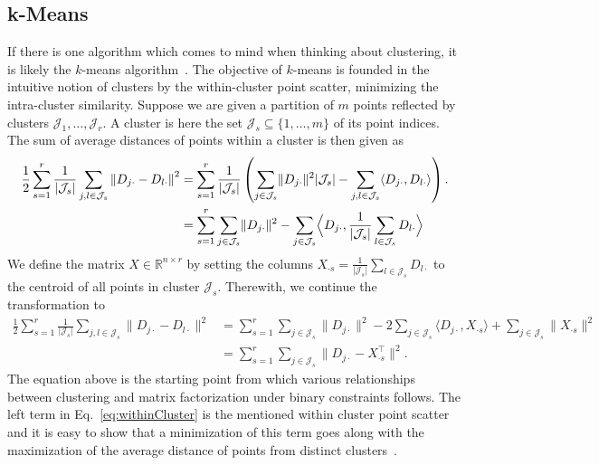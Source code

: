 \subsection{k-Means}\label{sec:ZS:kmeans}
If there is one algorithm which comes to mind when thinking about clustering, it is likely the $k$-means algorithm~\citep{lloyd1982least}. The objective of $k$-means is founded in the intuitive notion of clusters by the within-cluster point scatter, minimizing the intra-cluster similarity.
Suppose we are given a partition of $m$ points reflected by clusters $\mathcal{J}_1,\ldots, \mathcal{J}_r$. A cluster is here the set $\mathcal{J}_s\subseteq \{1,\ldots, m\}$ of its point indices. The sum of average distances of points within a cluster is then given as
\begin{align*}
\frac{1}{2}\sum_{s=1}^r\frac{1}{\lvert \mathcal{J}_s\rvert }\sum_{j,l\in \mathcal{J}_s} \left\lVert D_{j\cdot}-D_{l\cdot}\right\rVert ^2 
&= \sum_{s=1}^r \frac{1}{\lvert \mathcal{J}_s\rvert }\left(\sum_{j\in \mathcal{J}_s} \lVert D_{j\cdot}\rVert ^2\lvert \mathcal{J}_s\rvert  - \sum_{j,l\in \mathcal{J}_s}\langle D_{j\cdot},D_{l\cdot}\rangle\right).\\
&= \sum_{s=1}^r \sum_{j\in \mathcal{J}_s} \lVert D_{j\cdot }\rVert ^2 -\sum_{j\in \mathcal{J}_s}\Bigl\langle D_{j\cdot},\frac{1}{\lvert \mathcal{J}_s\rvert }\sum_{l\in\mathcal{J}_s}D_{l\cdot}\Bigr\rangle
\end{align*}
We define the matrix $X\in\mathbb{R}^{n\times r}$ by setting the columns $X_{\cdot s}=\frac{1}{\lvert \mathcal{J}_s\rvert }\sum_{l\in\mathcal{J}_s}D_{l\cdot}$ to the centroid of all points in cluster $\mathcal{J}_s$. Therewith, we continue the transformation to
\begin{align}
\frac{1}{2}\sum_{s=1}^r\frac{1}{\lvert \mathcal{J}_s\rvert }\sum_{j,l\in \mathcal{J}_s} \lVert D_{j\cdot}-D_{l\cdot}\rVert ^2 
&= \sum_{s=1}^r \sum_{j\in \mathcal{J}_s} \lVert D_{j\cdot }\rVert ^2 -2\sum_{j\in \mathcal{J}_s}\langle D_{j\cdot},X_{\cdot s}\rangle +\sum_{j\in \mathcal{J}_s}\lVert X_{\cdot s}\rVert ^2 \label{eq:withinCluster}\\
&= \sum_{s=1}^r \sum_{j\in \mathcal{J}_s} \bigl\lVert D_{j\cdot} -X_{\cdot s}^\top\bigr\rVert ^2.\nonumber
\end{align}
The equation above is the starting point from which various relationships between clustering and matrix factorization under binary constraints follows. The left term in Eq.~\eqref{eq:withinCluster} is the mentioned within cluster point scatter and it is easy to show that a minimization of this term goes along with the maximization of the average distance of points from distinct clusters~\citep{friedman2001elements}. 

